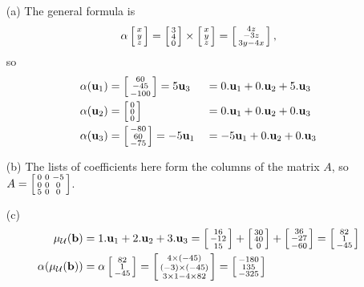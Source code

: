  \begin{itemize}
  \item[(a)] The general formula is
   \[ \alpha\left[\begin{smallmatrix} x\\ y\\ z\end{smallmatrix}\right]=\left[\begin{smallmatrix} 3\\4\\0\end{smallmatrix}\right]\times\left[\begin{smallmatrix} x\\ y\\ z\end{smallmatrix}\right]
       = \left[\begin{smallmatrix} 4z\\ -3z\\ 3y-4x\end{smallmatrix}\right],
   \]
   so
   \begin{align*}
    \alpha(\mathbf{u}_1) &= \left[\begin{smallmatrix} 60\\-45\\-100\end{smallmatrix}\right] = 5\mathbf{u}_3
               &&= 0.\mathbf{u}_1 + 0.\mathbf{u}_2 + 5.\mathbf{u}_3 \\
    \alpha(\mathbf{u}_2) &= \left[\begin{smallmatrix} 0\\0\\0\end{smallmatrix}\right]
               &&= 0.\mathbf{u}_1 + 0.\mathbf{u}_2 + 0.\mathbf{u}_3 \\
    \alpha(\mathbf{u}_3) &= \left[\begin{smallmatrix} -80\\60\\-75\end{smallmatrix}\right] = -5\mathbf{u}_1
               &&= -5\mathbf{u}_1+0.\mathbf{u}_2+0.\mathbf{u}_3
   \end{align*}
  \item[(b)]
   The lists of coefficients here form the columns of the
   matrix $A$, so $A=\left[\begin{smallmatrix} 0&0&-5\\ 0&0&0\\ 5&0&0\end{smallmatrix}\right]$.
  \item[(c)]
   \begin{align*}
    \mu_\CU(\vb) &= 1.\vu_1 + 2.\vu_2 + 3.\vu_3
                  = \bsm 16\\ -12\\ 15\esm +
                    \bsm 30\\ 40\\ 0\esm +
                    \bsm 36\\-27\\-60\esm
                  = \bsm 82\\ 1\\-45\esm \\
    \al(\mu_\CU(\vb))
     &= \al\bsm 82\\ 1\\ -45 \esm
      = \bsm 4\tm (-45) \\ (-3) \tm (-45) \\ 3\tm 1 - 4\tm 82\esm
      = \bsm -180 \\ 135 \\ -325 \esm \\

\end{align*}
\end{itemize}
